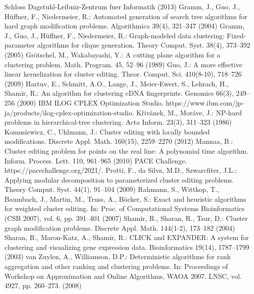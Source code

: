 \documentclass[10.5,a4paper,titlepage, dvipdfmx]{bxjsarticle}
\begin{document}
\begin{thebibliography}{}
    Schloss Dagstuhl-Leibniz-Zentrum fuer Informatik (2013)
    \bibitem{} Gramm, J., Guo, J., Hüffner, F., Niedermeier, R.: Automated generation of search
    tree algorithms for hard graph modification problems. Algorithmica 39(4), 321--347
    (2004)
    \bibitem{} Gramm, J., Guo, J., Hüffner, F., Niedermeier, R.: Graph-modeled data clustering:
    Fixed-parameter algorithms for clique generation. Theory Comput. Syst. 38(4),
    373--392 (2005)
    \bibitem{} Grötschel, M., Wakabayashi, Y.: A cutting plane algorithm for a clustering
    problem. Math. Program. 45, 52--96 (1989)
    \bibitem{} Guo, J.: A more effective linear kernelization for cluster editing. Theor. Comput.
    Sci. 410(8-10), 718--726 (2009)
    \bibitem{} Hartuv, E., Schmitt, A.O., Lange, J., Meier-Ewert, S., Lehrach, H., Shamir, R.:
    An algorithm for clustering cDNA fingerprints. Genomics 66(3), 249--256 (2000)
    \bibitem{} IBM ILOG CPLEX Optimization Studio. https://www.ibm.com/jp-ja/products/ilog-cplex-optimization-studio.
    \bibitem{} Křivánek, M., Moráve, J.: NP-hard problems in hierarchical-tree clustering. Acta
    Inform. 23(3), 311--323 (1986)
    \bibitem{}  Komusiewicz, C., Uhlmann, J.: Cluster editing with locally bounded modifications.
    Discrete Appl. Math. 160(15), 2259--2270 (2012)
    \bibitem{}  Mannaa, B.: Cluster editing problem for points on the real line: A polynomial time
    algorithm. Inform. Process. Lett. 110, 961--965 (2010)
    \bibitem{} PACE Challenge. https://pacechallenge.org/2021/.
    \bibitem{} Protti, F., da Silva, M.D., Szwarcfiter, J.L.: Applying modular decomposition
    to parameterized cluster editing problems. Theory Comput. Syst. 44(1), 91--104
    (2009)
    \bibitem{}  Rahmann, S., Wittkop, T., Baumbach, J., Martin, M., Truss, A., Böcker, S.: Exact
    and heuristic algorithms for weighted cluster editing. In: Proc. of Computational
    Systems Bioinformatics (CSB 2007), vol. 6, pp. 391--401 (2007)
    \bibitem{}  Shamir, R., Sharan, R., Tsur, D.: Cluster graph modification problems. Discrete
    Appl. Math. 144(1-2), 173--182 (2004)
    \bibitem{} Sharan, R., Maron-Katz, A., Shamir, R.: CLICK and EXPANDER: A system for
    clustering and visualizing gene expression data. Bioinformatics 19(14), 1787--1799
    (2003)
    \bibitem{} van Zuylen, A., Williamson, D.P.: Deterministic algorithms for rank aggregation and other ranking and clustering problems.
    In: Proceedings of Workshop on Approximation and Online Algorithms, WAOA 2007. LNSC, vol. 4927, pp. 260--273. (2008)
\end{thebibliography}
\end{document}
